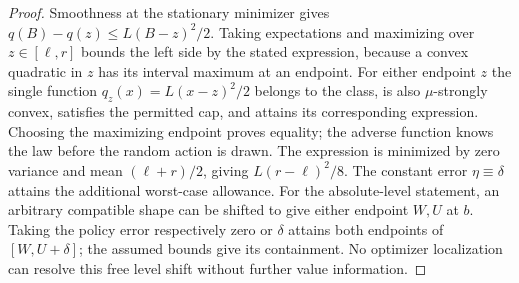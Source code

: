 \begin{proof}
Smoothness at the stationary minimizer gives
$q(B)-q(z)\le L(B-z)^2/2$. Taking expectations and maximizing
over $z\in[\ell,r]$ bounds the left side by the stated expression,
because a convex quadratic in $z$ has its interval maximum at an
endpoint. For either endpoint $z$ the single function
$q_z(x)=L(x-z)^2/2$ belongs to the class, is also
$\mu$-strongly convex, satisfies the permitted cap, and attains
its corresponding expression. Choosing the maximizing endpoint
proves equality; the adverse function knows the law before the
random action is drawn. The expression is minimized by zero
variance and mean $(\ell+r)/2$, giving $L(r-\ell)^2/8$.
The constant error $\eta\equiv\delta$ attains the additional
worst-case allowance. For the absolute-level statement, an arbitrary
compatible shape can be shifted to give either endpoint $W,U$ at
$b$. Taking the policy error respectively zero or $\delta$ attains
both endpoints of $[W,U+\delta]$; the assumed bounds give its
containment. No optimizer localization can resolve this free level
shift without further value information.
\end{proof}

